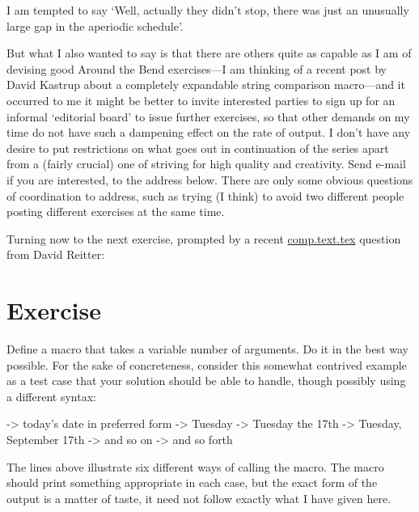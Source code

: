 I am tempted to say `Well, actually they didn't stop, there was 
just an unusually large gap in the aperiodic schedule'. 

But what I also wanted to say is that there are others quite as 
capable as I am of devising good Around the Bend 
exercises---I am thinking of a recent post by David Kastrup 
about a completely expandable string comparison macro---and it 
occurred to me it might be better to invite interested parties 
to sign up for an informal `editorial board' to issue further 
exercises, so that other demands on my time do not have such a 
dampening effect on the rate of output. I don't have any desire 
to put restrictions on what goes out in continuation of the 
series apart from a (fairly crucial) one of striving for high 
quality and creativity. Send e-mail if you are interested, to 
the address below. There are only some obvious questions of 
coordination to address, such as trying (I think) to avoid two 
different people posting different exercises at the same time. 

Turning now to the next exercise, prompted by a recent 
\url{comp.text.tex} question from David Reitter: 


\section{Exercise}

    Define a macro that takes a variable number 
of arguments. Do it in the best way possible. For the sake of 
concreteness, consider this somewhat contrived example as a test 
case that your solution should be able to handle, though 
possibly using a different syntax:
\begin{lcode}
\printdate                         -> today's date in preferred form 
\printdate[Tuesday]                -> Tuesday
\printdate[Tuesday][17]            -> Tuesday the 17th
\printdate[Tuesday][17][9]         -> Tuesday, September 17th
\printdate[Tuesday][17][9][2002]   -> and so on
 -> and so forth 
\end{lcode}

    The lines above illustrate six different ways of calling the 
\cmd{\printdate} macro. The macro should print something appropriate 
in each case, but the exact form of the output is a matter of 
taste, it need not follow exactly what I have given here. 

